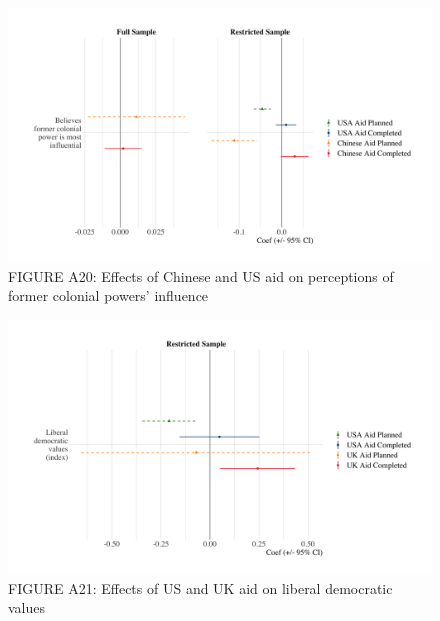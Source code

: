 \documentclass[9pt]{article}
\begin{document}
\begin{figure}[H]
\centering
\includegraphics[width=1\textwidth]{figures/figure_a20.png}
\caption{FIGURE A20: Effects of Chinese and US aid on perceptions of former colonial powers' influence}
\end{figure}

\begin{figure}[H]
\centering
\includegraphics[width=1\textwidth]{figures/figure_a21.png}
\caption{FIGURE A21: Effects of US and UK aid on liberal democratic values}
\end{figure}
\end{document}
